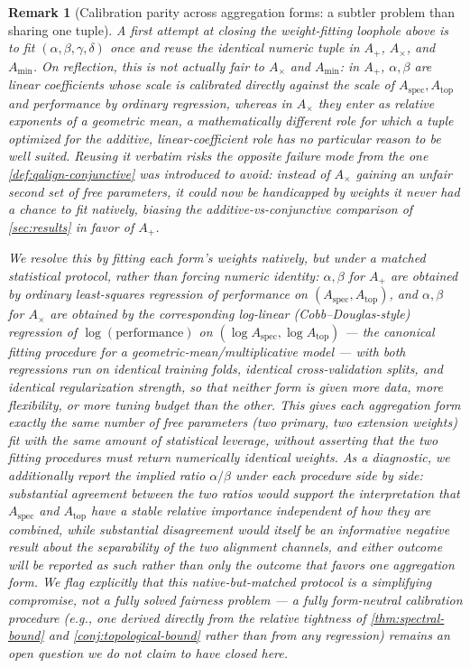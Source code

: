 \documentclass[11pt]{article}
\newtheorem{remark}[theorem]{Remark}
\newcommand{\Aspec}{A_{\mathrm{spec}}}
\newcommand{\Atop}{A_{\mathrm{top}}}
\begin{document}
\begin{remark}[Calibration parity across aggregation forms: a subtler problem than sharing one tuple]
\label{rem:shared-weights}
A first attempt at closing the weight-fitting loophole above is to fit $(\alpha,\beta,\gamma,\delta)$ \emph{once} and reuse the identical numeric tuple in $A_+$, $A_\times$, and $A_{\min}$. On reflection, this is not actually fair to $A_\times$ and $A_{\min}$: in $A_+$, $\alpha,\beta$ are linear coefficients whose scale is calibrated directly against the scale of $\Aspec,\Atop$ and performance by ordinary regression, whereas in $A_\times$ they enter as \emph{relative exponents} of a geometric mean, a mathematically different role for which a tuple optimized for the additive, linear-coefficient role has no particular reason to be well suited. Reusing it verbatim risks the opposite failure mode from the one \cref{def:qalign-conjunctive} was introduced to avoid: instead of $A_\times$ gaining an unfair second set of free parameters, it could now be handicapped by weights it never had a chance to fit natively, biasing the additive-vs-conjunctive comparison of \cref{sec:results} \emph{in favor of} $A_+$.

We resolve this by fitting each form's weights \emph{natively}, but under a matched statistical protocol, rather than forcing numeric identity: $\alpha,\beta$ for $A_+$ are obtained by ordinary least-squares regression of performance on $(\Aspec,\Atop)$, and $\alpha,\beta$ for $A_\times$ are obtained by the corresponding log-linear (Cobb--Douglas-style) regression of $\log(\text{performance})$ on $(\log\Aspec, \log\Atop)$ --- the canonical fitting procedure for a geometric-mean/multiplicative model --- with both regressions run on identical training folds, identical cross-validation splits, and identical regularization strength, so that neither form is given more data, more flexibility, or more tuning budget than the other. This gives each aggregation form exactly the same \emph{number} of free parameters (two primary, two extension weights) fit with the same \emph{amount} of statistical leverage, without asserting that the two fitting procedures must return numerically identical weights. As a diagnostic, we additionally report the implied ratio $\alpha/\beta$ under each procedure side by side: substantial agreement between the two ratios would support the interpretation that $\Aspec$ and $\Atop$ have a stable relative importance independent of how they are combined, while substantial disagreement would itself be an informative negative result about the separability of the two alignment channels, and either outcome will be reported as such rather than only the outcome that favors one aggregation form. We flag explicitly that this native-but-matched protocol is a simplifying compromise, not a fully solved fairness problem --- a fully form-neutral calibration procedure (e.g., one derived directly from the relative tightness of \cref{thm:spectral-bound} and \cref{conj:topological-bound} rather than from any regression) remains an open question we do not claim to have closed here.


\end{remark}
\end{document}
